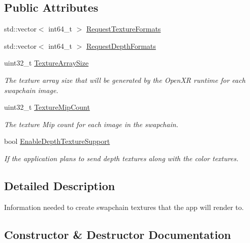 \subsection*{Public Attributes}
\begin{DoxyCompactItemize}
\item 
std\+::vector$<$ int64\+\_\+t $>$ \mbox{\hyperlink{struct_open_x_r_provider_1_1_x_r_render_info_a84860b74dcb11fbc7494883b555f3029}{Request\+Texture\+Formats}}
\item 
std\+::vector$<$ int64\+\_\+t $>$ \mbox{\hyperlink{struct_open_x_r_provider_1_1_x_r_render_info_aa4ba2f324a4ae14f1e51f2343dd1446b}{Request\+Depth\+Formats}}
\item 
uint32\+\_\+t \mbox{\hyperlink{struct_open_x_r_provider_1_1_x_r_render_info_a9bf5bd224350b3fcc79a1643b8cc85f6}{Texture\+Array\+Size}}
\begin{DoxyCompactList}\small\item\em The texture array size that will be generated by the Open\+XR runtime for each swapchain image. \end{DoxyCompactList}\item 
uint32\+\_\+t \mbox{\hyperlink{struct_open_x_r_provider_1_1_x_r_render_info_ad86a33b90d0f38aa11a3cd4e0dc521b4}{Texture\+Mip\+Count}}
\begin{DoxyCompactList}\small\item\em The texture Mip count for each image in the swapchain. \end{DoxyCompactList}\item 
bool \mbox{\hyperlink{struct_open_x_r_provider_1_1_x_r_render_info_a3016c0f6906b10295f8f6275fd637ea1}{Enable\+Depth\+Texture\+Support}}
\begin{DoxyCompactList}\small\item\em If the application plans to send depth textures along with the color textures. \end{DoxyCompactList}\end{DoxyCompactItemize}


\subsection{Detailed Description}
Information needed to create swapchain textures that the app will render to. 

\subsection{Constructor \& Destructor Documentation}
\mbox{\label{struct_open_x_r_provider_1_1_x_r_render_info_a5ece658891cf75177b282d3db14b8f77}} 
